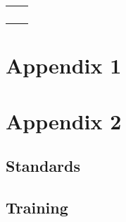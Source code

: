 \documentclass{scrreprt}
\begin{document}
\begin{longtable}{|l|p{5in}|}
\\
\hline

&

\\
\hline

&

\\
\hline

&

\\
\hline

&

\\
\hline

&

\\
\hline

\end{longtable}

\chapter{Appendix 1}
\chapter{Appendix 2}

  \section{Standards}
  \section{Training}

\end{document}
